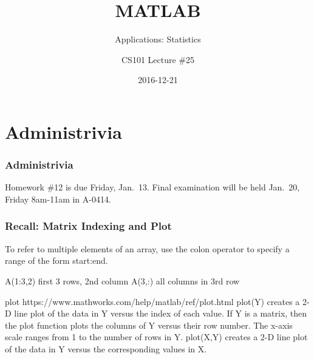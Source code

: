 \documentclass[11pt]{beamer}
\title{MATLAB}
\subtitle{Applications:  Statistics}
\author{CS101 Lecture \#25}
\date{2016-12-21}
\begin{document}
  \setcounter{showProgressBar}{0}
  \setcounter{showSlideNumbers}{0}

\frame{\titlepage}

\setcounter{framenumber}{0}
\setcounter{showProgressBar}{1}
\setcounter{showSlideNumbers}{1}

\section{Administrivia}

\begin{frame}
  \frametitle{Administrivia}
  \Enlarge

   \begin{itemize}
   	\myitem  Homework \#12 is due Friday, Jan.\ 13.  %
   	\myitem  Final examination will be held Jan.\ 20, Friday 8am-11am in A-0414.  %
   \end{itemize}
\end{frame}

\begin{frame}[fragile]
	\frametitle{Recall: Matrix Indexing and Plot}
	
	\begin{enumerate}
		\myitem  To refer to multiple elements of an array, use the colon operator to specify a range of the form start:end. 
		\begin{enumerate}
			\mysubitem  A(1:3,2) first 3 rows, 2nd column
			\mysubitem  A(3,:)  all columns in 3rd row
		\end{enumerate}
		\myitem plot https://www.mathworks.com/help/matlab/ref/plot.html
		\myitem plot(Y) creates a 2-D line plot of the data in Y versus the index of each value. If Y is a matrix, then the plot function plots the columns of Y versus their row number. The x-axis scale ranges from 1 to the number of rows in Y.
		\myitem plot(X,Y) creates a 2-D line plot of the data in Y versus the corresponding values in X.
	\end{enumerate}
\end{frame}
\end{document}
